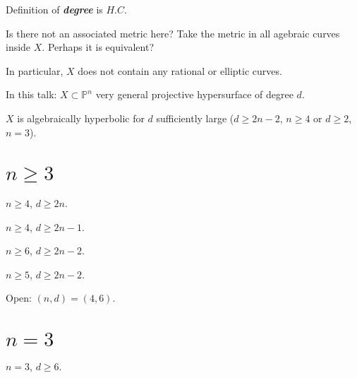 \begin{remark}[Vitorio]\leavevmode
	Definition of \textit{\textbf{degree}} is $H.C$.
\end{remark}

\begin{remark}[Misha]\leavevmode
	Is there not an associated metric here? Take the metric in all agebraic curves inside $X$. Perhaps it is equivalent?
\end{remark}

\begin{remark}\leavevmode
	In particular, $X$ does not contain any rational or elliptic curves.
\end{remark}

In this talk: $X \subset \mathbb{P}^n$ very general projective hypersurface of degree $d$.

\begin{conjecture}[Kobayashi]
$X$ is algebraically hyperbolic for $d$ sufficiently large ($d\geq 2n-2$, $n\geq 4$ or $d\geq 2$, $n=3$).
\end{conjecture}

\section{$n\geq 3$}

\begin{thm}[Clemens '86, E. '88]\leavevmode
$n \geq  4$, $d\geq 2n$.
\end{thm}

\begin{thm}[Voisin, '96, 98]\leavevmode
$n \geq 4$, $d \geq  2n-1$.
\end{thm}

\begin{thm}\leavevmode
$n\geq 6$, $d \geq  2n-2$.
\end{thm}

\begin{thm}[Yeong '22]\leavevmode
$n\geq 5$, $d\geq 2n-2$.
\end{thm}

Open: $(n,d)=(4,6)$.

\section{$n=3$}

\begin{thm}[Xu, '94]\leavevmode
$n=3$, $d \geq  6$.
\end{thm}

